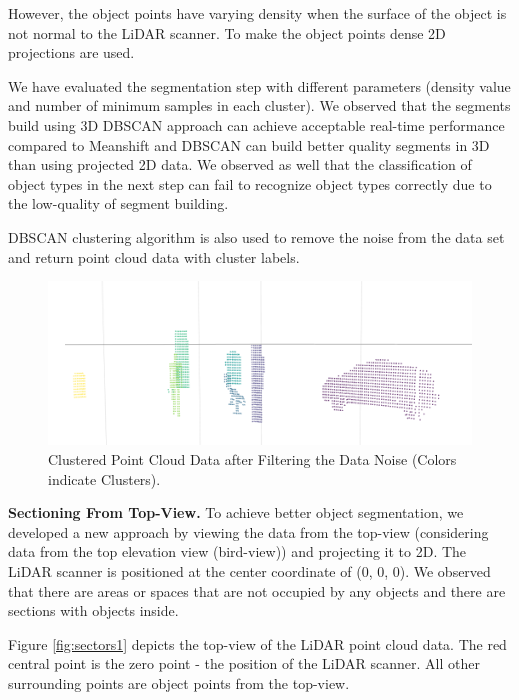 However, the object points have varying density when the surface of the object is not normal to the LiDAR scanner. 
To make the object points dense 2D projections are used.

We have evaluated the segmentation step with different parameters (density value and number of minimum samples in each cluster).
We observed that the segments build using 3D DBSCAN approach can achieve acceptable
real-time performance 
compared to Meanshift 
and DBSCAN can build better quality segments in 3D than 
using 
projected 2D data. We observed as well that the classification of object types in the
next step can fail to recognize object types correctly due to the low-quality of segment
building.


DBSCAN clustering algorithm is also used to remove the noise from the data set and return point cloud data with cluster labels.


\begin{figure}[!h]
\begin{center}
  \includegraphics[width=.55\linewidth]{./images/seg_noise_removal.png}
  \caption{Clustered Point Cloud Data after Filtering the Data Noise (Colors indicate Clusters). }
  \label{fig:ClusteringWithNoiseFiltering}
\end{center}
\end{figure}



\textbf{Sectioning From Top-View.}
To achieve better object segmentation, we developed a new approach by viewing the data from the top-view (considering data from the top elevation view (bird-view)) and projecting it to 2D. The LiDAR scanner is positioned at the center coordinate
of (0, 0, 0).  We observed that there are areas or spaces that are not occupied by any
objects and there are sections with objects inside.

Figure \ref{fig:sectors1} depicts the top-view of the LiDAR point cloud data.
The red central point is the zero point - the position of the LiDAR scanner.
All other surrounding points are object points from the top-view.

